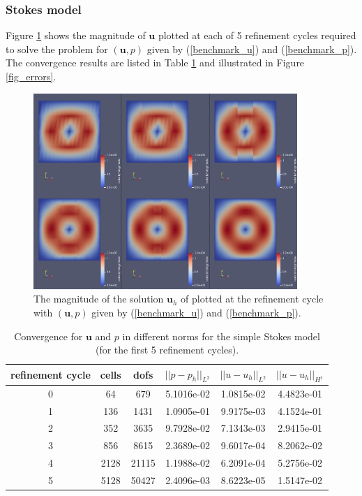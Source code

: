 \documentclass[12pt,a4paper]{article}
\theoremstyle{definition}
\begin{document}
\subsubsection{Stokes model}
Figure \ref{fig_stokes_sol}  shows the magnitude of $\textbf{u}$ plotted at each of 5 refinement cycles required to solve the problem for $\left(\textbf{u}, p\right)$ given by (\ref{benchmark_u}) and (\ref{benchmark_p}).  The convergence results are listed in Table \ref{tablebenchmark_convergence} and illustrated in Figure \ref{fig_errors}.
\begin{figure}[H]
	\centering
	\includegraphics[width=10cm]{stokes_cg_velocities}
	\caption{The magnitude of the solution $\textbf{u}_h$ of plotted at the refinement cycle with $\left(\textbf{u},p\right)$ given by (\ref{benchmark_u}) and (\ref{benchmark_p}).}
	\label{fig_stokes_sol}
\end{figure}
\begin{table}[H]
	\begin{center}
		\begin{tabular}{|c|c|c|c|c|c|} \hline
			refinement cycle & cells & dofs & $||p-p_h||_{L^2}$ & $||u-u_h||_{L^2}$ & $||u-u_h||_{H^1}$\\ \hline
			0 & 64 & 679 & 5.1016e-02 & 1.0815e-02 & 4.4823e-01\\ \hline
			1 & 136 & 1431 & 1.0905e-01 & 9.9175e-03 & 4.1524e-01\\ \hline
			2 & 352 & 3635 & 9.7928e-02 & 7.1343e-03 & 2.9415e-01\\ \hline
			3 & 856 & 8615 & 2.3689e-02 & 9.6017e-04 & 8.2062e-02\\ \hline
			4 & 2128 & 21115 & 1.1988e-02 & 6.2091e-04 & 5.2756e-02\\ \hline
			5 & 5128 & 50427 & 2.4096e-03 & 8.6223e-05 & 1.5147e-02\\ \hline
		\end{tabular}
		\caption{Convergence for $\textbf{u}$ and $p$ in different norms for the simple Stokes model (for the first 5 refinement cycles).}
		\label{tablebenchmark_convergence}
	\end{center}
\end{table}
\end{document}
